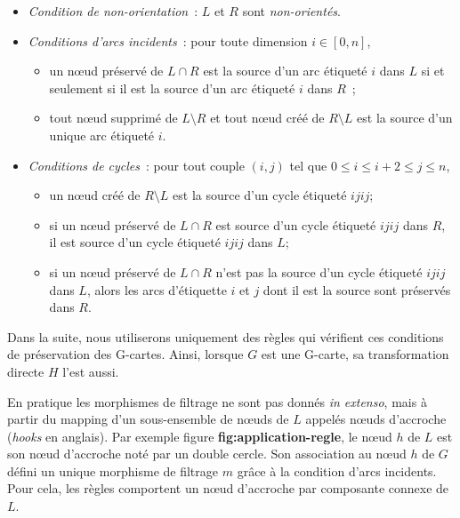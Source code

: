 \begin{theoreme}

	\begin{itemize}
		\label{theo:topo-coherence-base-rule}
		\item \emph{Condition de non-orientation} : $L$ et $R$ sont \emph{non-orientés}.
		\item \emph{Conditions d'arcs incidents} : pour toute dimension $i \in [0,n]$,
		      \begin{itemize}
			      \item un nœud préservé de $L \cap R$ est la source d'un arc étiqueté $i$ dans $L$ si et seulement si il est la source d'un arc étiqueté $i$ dans $R$~;
			      \item tout nœud supprimé de $L \setminus R$ et tout nœud créé de $R \setminus L$ est la source d'un unique arc étiqueté $i$.
		      \end{itemize}
		\item \emph{Conditions de cycles} : pour tout couple $(i,j)$ tel que $0 \leq i \leq i + 2 \leq j \leq n$,
		      \begin{itemize}
			      \item un nœud créé de $R \setminus L$ est la source d'un cycle étiqueté $ijij$;
			      \item si un nœud préservé de $L \cap R$ est source d'un cycle étiqueté $ijij$ dans $R$, il est source d'un cycle étiqueté $ijij$
			            dans $L$;
			      \item si un nœud préservé de $L \cap R$ n'est pas la source d'un cycle
			            étiqueté $ijij$ dans $L$, alors les arcs d'étiquette $i$ et
			            $j$ dont il est la source sont préservés dans $R$.
		      \end{itemize}
	\end{itemize}
\end{theoreme}

Dans la suite, nous utiliserons uniquement des règles qui vérifient ces conditions de préservation des G-cartes. Ainsi, lorsque $G$ est une G-carte, sa transformation directe $H$ l'est aussi.

En pratique les morphismes de filtrage ne sont pas donnés \textit{in extenso},
mais à partir du mapping d'un sous-ensemble de nœuds de $L$ appelés nœuds
d'accroche (\textit{hooks} en anglais). Par exemple figure
\textbf{fig:application-regle}, le nœud $h$ de $L$ est son nœud d'accroche noté
par un double cercle. Son association au nœud $h$ de $G$ défini un unique
morphisme de filtrage $m$ grâce à la condition d'arcs incidents. Pour cela, les
règles comportent un nœud d'accroche par composante connexe de $L$.


